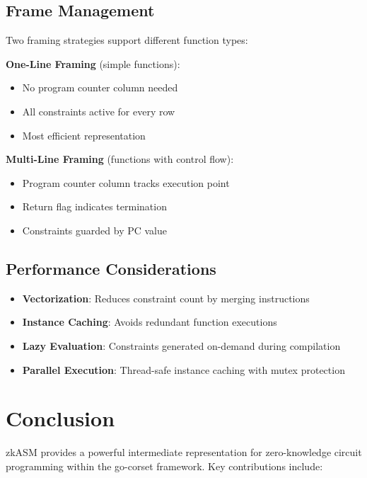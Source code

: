 \documentclass[11pt,a4paper]{article}
\begin{document}
\subsection{Frame Management}

Two framing strategies support different function types:

\textbf{One-Line Framing} (simple functions):
\begin{itemize}
    \item No program counter column needed
    \item All constraints active for every row
    \item Most efficient representation
\end{itemize}

\textbf{Multi-Line Framing} (functions with control flow):
\begin{itemize}
    \item Program counter column tracks execution point
    \item Return flag indicates termination
    \item Constraints guarded by PC value
\end{itemize}

\subsection{Performance Considerations}

\begin{itemize}
    \item \textbf{Vectorization}: Reduces constraint count by merging instructions
    \item \textbf{Instance Caching}: Avoids redundant function executions
    \item \textbf{Lazy Evaluation}: Constraints generated on-demand during compilation
    \item \textbf{Parallel Execution}: Thread-safe instance caching with mutex protection
\end{itemize}

\section{Conclusion}

zkASM provides a powerful intermediate representation for zero-knowledge circuit programming within the go-corset framework. Key contributions include:
\end{document}
